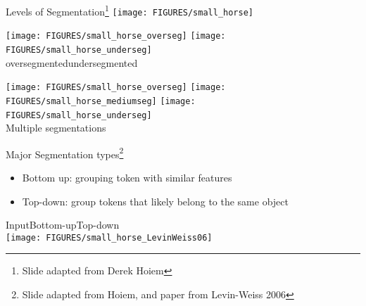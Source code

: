 \documentclass[9pt]{beamer}
\begin{document}
\begin{frame}{Levels of Segmentation\footnote{Slide adapted from Derek Hoiem}}
\hfill\texttt{[image: FIGURES/small\_horse]}\\
\begin{center}
  \hfill\texttt{[image: FIGURES/small\_horse\_overseg]}\hfill
  \texttt{[image: FIGURES/small\_horse\_underseg]}~~~~~~~~~\hfill\\
  \hfill oversegmented\hfill undersegmented~~~~~~~~~~~~~~\hfill
\end{center}
\begin{center}
   \hfill\texttt{[image: FIGURES/small\_horse\_overseg]}\hfill
   \texttt{[image: FIGURES/small\_horse\_mediumseg]}\hfill
  \texttt{[image: FIGURES/small\_horse\_underseg]}~~~\hfill\\
  Multiple segmentations
\end{center}
\end{frame}



\begin{frame}{Major Segmentation types\footnote{Slide adapted from Hoiem, and paper from Levin-Weiss 2006}}
  \begin{itemize}
  \item Bottom up: grouping token with similar features
  \item Top-down: group tokens that likely belong to the same object
    \vfill
  \end{itemize}
    \begin{center}
      Input\hfill Bottom-up\hfill Top-down\\
      \texttt{[image: FIGURES/small\_horse\_LevinWeiss06]}
    \end{center}
\end{frame}
\end{document}
